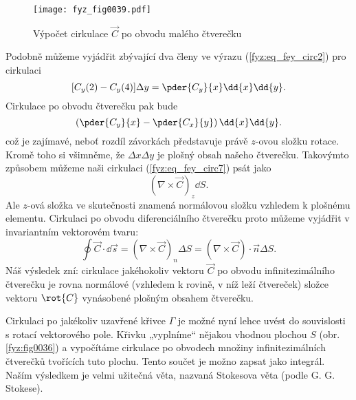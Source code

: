       \begin{figure}[ht!]  %
        \centering
        \texttt{[image: fyz\_fig0039.pdf]}
        \caption{Výpočet cirkulace \(\vec{C}\) po obvodu malého čtverečku}
        \label{fyz:fig0039}
      \end{figure}
      Podobně můžeme vyjádřit zbývající dva členy ve výrazu (\ref{fyz:eq_fey_circ2}) pro cirkulaci
      \begin{equation}\label{fyz:eq_fey_circ6}
        [C_y(2) - C_y(4)]\Delta y = \pder{C_y}{x}\dd{x}\dd{y}.  
      \end{equation}    
      Cirkulace po obvodu čtverečku pak bude
      \begin{equation}\label{fyz:eq_fey_circ7}
        \left(\pder{C_y}{x}-\pder{C_x}{y}\right)\dd{x}\dd{y}.  
      \end{equation}    
      což je zajímavé, neboť rozdíl závorkách představuje právě \(z\)-ovou složku rotace. Kromě toho
      si všimněme, že \(\Delta x\Delta y\) je plošný obsah našeho čtverečku. Takovýmto způsobem
      můžeme naši cirkulaci (\ref{fyz:eq_fey_circ7}) psát jako
      \begin{equation}\label{fyz:eq_fey_circ8}
        (\nabla\times\vec{C})_z\dd{S}.  
      \end{equation}
      Ale \(z\)-ová složka ve skutečnosti znamená normálovou složku vzhledem k plošnému elementu. 
      Cirkulaci po obvodu diferenciálního čtverečku proto můžeme vyjádřit v invariantním vektorovém 
      tvaru:
      \begin{equation}\label{fyz:eq_fey_circ9}
        \oint\vec{C}\cdot\dd{\vec{s}} 
          = (\nabla\times\vec{C})_n\Delta S = (\nabla\times\vec{C})\cdot\vec{n}\Delta S.  
      \end{equation} 
      Náš výsledek zní: cirkulace jakéhokoliv vektoru \(\vec{C}\) po obvodu infinitezimálního 
      čtverečku je rovna normálové (vzhledem k rovině, v níž leží čtvereček) složce vektoru 
      \(\rot{C}\) vynásobené plošným obsahem čtverečku.
    
      Cirkulaci po jakékoliv uzavřené křivce \(\Gamma\) je možné nyní lehce uvést do souvislosti s 
      rotací vektorového pole. Křivku „vyplníme“ nějakou vhodnou plochou \(S\) (obr. 
      \ref{fyz:fig0036}) a vypočítáme cirkulace po obvodech množiny infinitezimálních čtverečků 
      tvořících tuto plochu. Tento součet je možno zapsat jako integrál. Naším výsledkem je velmi 
      užitečná věta, nazvaná Stokesova věta (podle G. G. Stokese).
    
